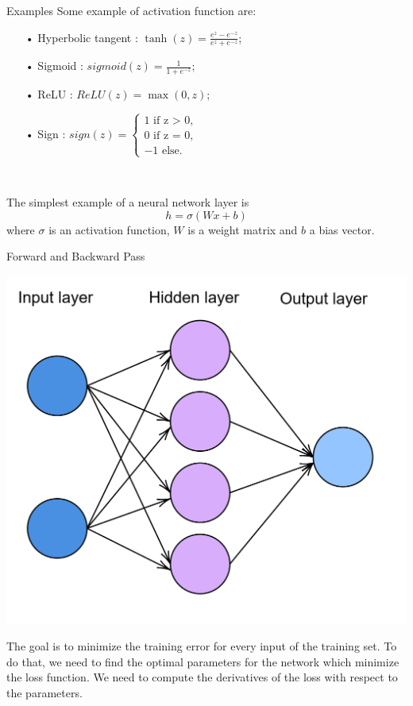 \documentclass[11pt]{beamer}
\begin{document}
\begin{frame}{Examples}
Some example of activation function are:
\begin{itemize}
\item[•] Hyperbolic tangent : $\tanh(z) = \frac{e^z - e^{-z}}{e^z + e^{-z}}$;

\item[•] Sigmoid : $sigmoid(z) = \frac{1}{1 + e^{-z}}$;
\item[•] ReLU : $ReLU(z) = \max(0,z)$;
\item[•] Sign : $sign(z) = \begin{cases}
1 \text{ if z > 0},\\
0 \text{ if z = 0},\\
-1 \text{ else}.
\end{cases}$
\end{itemize}

~

The simplest example of a neural network layer is 
$$
h = \sigma (Wx +b)
$$
where $\sigma$ is an activation function, $W$ is a weight matrix and $b$ a bias vector.
\end{frame}

\begin{frame}{Forward and Backward Pass}

\begin{center}
\includegraphics[scale=0.14]{nn.png}
\end{center}


The goal is to minimize the training error for every input of the training set. To do that, we need to find the optimal parameters for the network which minimize the loss function. We need to compute the derivatives of the loss with respect to the parameters.
\end{frame}
\end{document}
